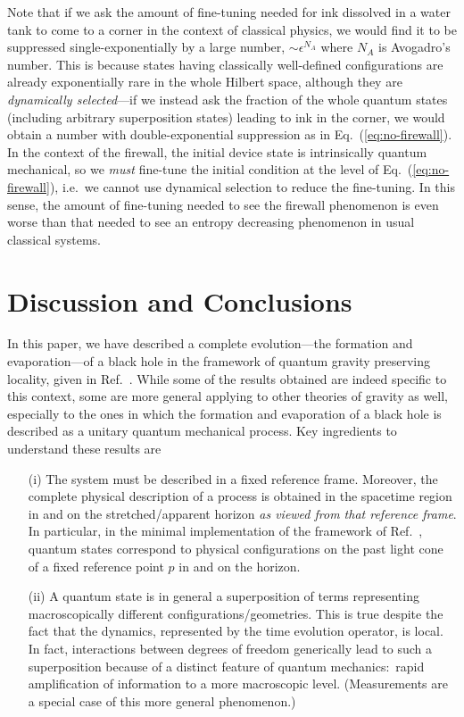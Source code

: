 \documentclass[12pt]{article}
\begin{document}
Note that if we ask the amount of fine-tuning needed for ink dissolved 
in a water tank to come to a corner in the context of classical physics, 
we would find it to be suppressed single-exponentially by a large number, 
$\sim \epsilon^{N_A}$ where $N_A$ is Avogadro's number.  This is because 
states having classically well-defined configurations are already 
exponentially rare in the whole Hilbert space, although they are {\it 
dynamically selected}---if we instead ask the fraction of the whole 
quantum states (including arbitrary superposition states) leading to ink 
in the corner, we would obtain a number with double-exponential suppression 
as in Eq.~(\ref{eq:no-firewall}).  In the context of the firewall, the 
initial device state is intrinsically quantum mechanical, so we {\it must} 
fine-tune the initial condition at the level of Eq.~(\ref{eq:no-firewall}), 
i.e.\ we cannot use dynamical selection to reduce the fine-tuning.  In 
this sense, the amount of fine-tuning needed to see the firewall phenomenon 
is even worse than that needed to see an entropy decreasing phenomenon 
in usual classical systems.


\section{Discussion and Conclusions}
\label{sec:concl}

In this paper, we have described a complete evolution---the formation 
and evaporation---of a black hole in the framework of quantum gravity 
preserving locality, given in Ref.~\cite{Nomura:2011rb}.  While some 
of the results obtained are indeed specific to this context, some are 
more general applying to other theories of gravity as well, especially 
to the ones in which the formation and evaporation of a black hole is 
described as a unitary quantum mechanical process.  Key ingredients to 
understand these results are
%
\begin{itemize}
%
\item[(i)]
The system must be described in a fixed reference frame.  Moreover, the 
complete physical description of a process is obtained in the spacetime 
region in and on the stretched/apparent horizon {\it as viewed from 
that reference frame}.  In particular, in the minimal implementation 
of the framework of Ref.~\cite{Nomura:2011rb}, quantum states correspond 
to physical configurations on the past light cone of a fixed reference 
point $p$ in and on the horizon.
%
\item[(ii)]
A quantum state is in general a superposition of terms representing 
macroscopically different configurations/geometries.  This is true 
despite the fact that the dynamics, represented by the time evolution 
operator, is local.  In fact, interactions between degrees of freedom 
generically lead to such a superposition because of a distinct feature 
of quantum mechanics:\ rapid amplification of information to a more 
macroscopic level.  (Measurements are a special case of this more 
general phenomenon.)
%
\end{itemize}
%
\end{document}
